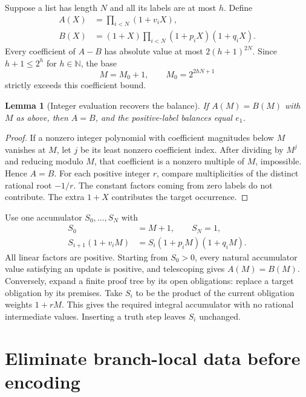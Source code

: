 \documentclass[11pt,a4paper]{article}
\newtheorem{lemma}[theorem]{Lemma}
\theoremstyle{definition}\newtheorem{definition}[theorem]{Definition}
\theoremstyle{remark}\newtheorem{remark}[theorem]{Remark}
\newcommand{\N}{\mathbb N}\newcommand{\Z}{\mathbb Z}\newcommand{\Q}{\mathbb Q}
\numberwithin{equation}{section}
\begin{document}
Suppose a list has length \(N\) and all its labels are at most \(h\).
Define
\begin{align}
 A(X)&=\prod_{i<N}(1+v_iX),\nonumber\\
 B(X)&=(1+X)\prod_{i<N}(1+p_iX)(1+q_iX).
\end{align}
Every coefficient of \(A-B\) has absolute value at most
\(2(h+1)^{2N}\). Since \(h+1\le2^h\) for \(h\in\N\), the base
\begin{equation}
 M=M_0+1,\qquad M_0=2^{2hN+1}
\label{eq:heightbase}
\end{equation}
strictly exceeds this coefficient bound.

\begin{lemma}[Integer evaluation recovers the balance]
If \(A(M)=B(M)\) with \(M\) as above, then \(A=B\), and the
positive-label balances equal \(e_1\).
\end{lemma}
\begin{proof}
If a nonzero integer polynomial with coefficient magnitudes below \(M\)
vanishes at \(M\), let \(j\) be its least nonzero coefficient index.
After dividing by \(M^j\) and reducing modulo \(M\), that coefficient
is a nonzero multiple of \(M\), impossible. Hence \(A=B\).
For each positive integer \(r\), compare multiplicities of the distinct
rational root \(-1/r\). The constant factors coming from zero labels
do not contribute. The extra \(1+X\) contributes the target occurrence.
\end{proof}

Use one accumulator \(S_0,\ldots,S_N\) with
\begin{equation}
\begin{split}
 S_0&=M+1,\qquad S_N=1,\\
 S_{i+1}(1+v_iM)&=S_i(1+p_iM)(1+q_iM).
\end{split}\label{eq:accumulator}
\end{equation}
All linear factors are positive. Starting from \(S_0>0\), every
natural accumulator value satisfying an update is positive, and
telescoping gives \(A(M)=B(M)\). Conversely, expand a finite proof tree
by its open obligations: replace a target obligation by its premises.
Take \(S_i\) to be the product of the current obligation weights
\(1+rM\). This gives the required integral accumulator with no rational
intermediate values. Inserting a truth step leaves \(S_i\) unchanged.

\section{Eliminate branch-local data before encoding}
\label{sec:projection}
\end{document}
